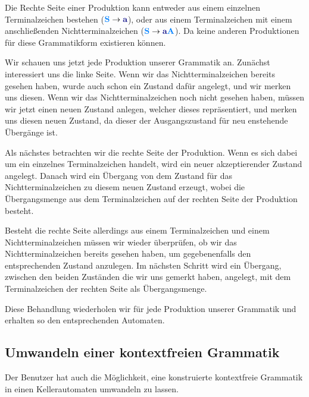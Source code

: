 Die Rechte Seite einer Produktion kann entweder aus einem einzelnen
Terminalzeichen bestehen ($\NonterminalSymbol{S} \to \TerminalSymbol{a}$), oder
aus einem Terminalzeichen mit einem anschließenden Nichtterminalzeichen
($\NonterminalSymbol{S} \to \TerminalSymbol{a}\NonterminalSymbol{A}$). Da keine
anderen Produktionen für diese Grammatikform existieren können.\vspace{10pt}

Wir schauen uns jetzt jede Produktion unserer Grammatik an.
Zunächst interessiert uns die linke Seite. Wenn wir das Nichtterminalzeichen
bereits gesehen haben, wurde auch schon ein Zustand dafür angelegt, und wir
merken uns diesen. Wenn wir das Nichtterminalzeichen noch nicht gesehen haben,
müssen wir jetzt einen neuen Zustand anlegen, welcher dieses repräsentiert, und
merken uns diesen neuen Zustand, da dieser der Ausgangszustand
für neu enstehende Übergänge ist.\vspace{10pt}

Als nächstes betrachten wir die rechte Seite der Produktion. Wenn es sich dabei
um ein einzelnes Terminalzeichen handelt, wird ein neuer akzeptierender Zustand
angelegt. Danach wird ein Übergang von dem Zustand für das Nichtterminalzeichen
zu diesem neuen Zustand erzeugt, wobei die Übergangsmenge aus dem
Terminalzeichen auf der rechten Seite der Produktion besteht.\vspace{10pt}

Besteht die rechte Seite allerdings aus einem Terminalzeichen und einem
Nichtterminalzeichen müssen wir wieder überprüfen, ob wir das
Nichtterminalzeichen bereits gesehen haben, um gegebenenfalls den
entsprechenden Zustand anzulegen. Im nächsten Schritt wird ein Übergang,
zwischen den beiden Zuständen die wir uns gemerkt haben, angelegt, mit dem
Terminalzeichen der rechten Seite als Übergangsmenge.\vspace{10pt}

Diese Behandlung wiederholen wir für jede Produktion unserer Grammatik und
erhalten so den entsprechenden Automaten.\vspace{10pt}

\subsection{Umwandeln einer kontextfreien Grammatik}\label{ConverToGrammarContextFree}

Der Benutzer hat auch die Möglichkeit, eine konstruierte kontextfreie Grammatik
in einen Kellerautomaten umwandeln zu lassen.\vspace{10pt}

